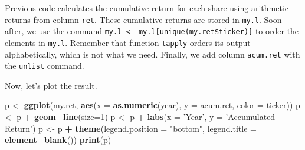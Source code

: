 \documentclass[11pt,]{book}
\newenvironment{Shaded}{\begin{snugshade}}{\end{snugshade}}
\newcommand{\KeywordTok}[1]{\textcolor[rgb]{0.27,0.27,0.27}{\textbf{#1}}}
\newcommand{\DataTypeTok}[1]{\textcolor[rgb]{0.27,0.27,0.27}{#1}}
\newcommand{\DecValTok}[1]{\textcolor[rgb]{0.06,0.06,0.06}{#1}}
\newcommand{\StringTok}[1]{\textcolor[rgb]{0.5,0.5,0.5}{#1}}
\newcommand{\CommentTok}[1]{\textcolor[rgb]{0.56,0.35,0.01}{\textit{#1}}}
\newcommand{\ControlFlowTok}[1]{\textcolor[rgb]{0.13,0.29,0.53}{\textbf{#1}}}
\newcommand{\OperatorTok}[1]{\textcolor[rgb]{0.81,0.36,0.00}{\textbf{#1}}}
\newcommand{\NormalTok}[1]{#1}
\begin{document}
\begin{Shaded}
\end{Shaded}

Previous code calculates the cumulative return for each share using
arithmetic returns from column \texttt{ret}. These cumulative returns
are stored in \texttt{my.l}. Soon after, we use the command
\texttt{my.l\ \textless{}-\ my.l{[}unique(my.ret\$ticker){]}} to order
the elements in \texttt{my.l}. Remember that function \texttt{tapply}
orders its output alphabetically, which is not what we need. Finally, we
add column \texttt{acum.ret} with the \texttt{unlist} command.

Now, let's plot the result.

\begin{Shaded}
\begin{Highlighting}[]
\NormalTok{p <-}\StringTok{ }\KeywordTok{ggplot}\NormalTok{(my.ret, }\KeywordTok{aes}\NormalTok{(}\DataTypeTok{x =} \KeywordTok{as.numeric}\NormalTok{(year), }
                        \DataTypeTok{y =}\NormalTok{ acum.ret, }
                        \DataTypeTok{color =}\NormalTok{ ticker))}
\NormalTok{p <-}\StringTok{ }\NormalTok{p }\OperatorTok{+}\StringTok{ }\KeywordTok{geom_line}\NormalTok{(}\DataTypeTok{size=}\DecValTok{1}\NormalTok{)}
\NormalTok{p <-}\StringTok{ }\NormalTok{p }\OperatorTok{+}\StringTok{ }\KeywordTok{labs}\NormalTok{(}\DataTypeTok{x =} \StringTok{'Year'}\NormalTok{, }
              \DataTypeTok{y =} \StringTok{'Accumulated Return'}\NormalTok{)}
\NormalTok{p <-}\StringTok{ }\NormalTok{p }\OperatorTok{+}\StringTok{ }\KeywordTok{theme}\NormalTok{(}\DataTypeTok{legend.position =} \StringTok{"bottom"}\NormalTok{,}
               \DataTypeTok{legend.title =} \KeywordTok{element_blank}\NormalTok{())}
\KeywordTok{print}\NormalTok{(p)}
\end{Highlighting}
\end{Shaded}
\end{document}
